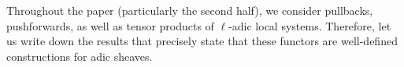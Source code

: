     Throughout the paper (particularly the second half), we consider pullbacks, pushforwards, as well as tensor products of $\ell$-adic local systems. Therefore, let us write down the results that precisely state that these functors are well-defined constructions for adic sheaves. 
        
        